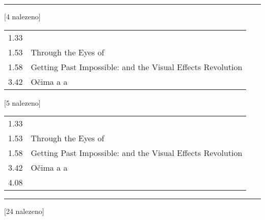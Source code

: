 \begin{table}[ht!]
\begin{tt}

\mbox{}\vspace{1em}
\hrule
\mbox{}

\noindent
\begin{minipage}[t]{.5\textwidth}\vspace{0pt}
 [4 nalezeno]\vspace{5pt}

\begin{tabulary}{1.1\textwidth}{LL}
1.33 &   \\
1.53 & Through the Eyes of   \\
1.58 & Getting Past Impossible:   and the Visual Effects Revolution \\
3.42 & Očima a a \\
\end{tabulary}
\end{minipage}
\begin{minipage}[t]{.5\textwidth}\vspace{0pt}
 [5 nalezeno]\vspace{5pt}

\begin{tabulary}{1.1\textwidth}{LL}
1.33 &   \\
1.53 & Through the Eyes of   \\
1.58 & Getting Past Impossible:   and the Visual Effects Revolution \\
3.42 & Očima a a \\
4.08 &   \\
\end{tabulary}
\end{minipage}

\mbox{}\vspace{5pt}
\hrule
\mbox{}

\noindent
\begin{minipage}[t]{.5\textwidth}\vspace{0pt}
 [24 nalezeno]\vspace{5pt}


\end{minipage}
\end{tt}
\end{table}
